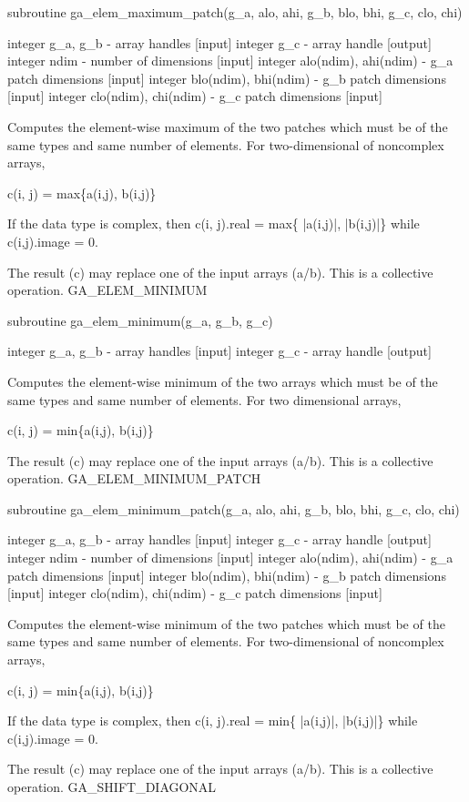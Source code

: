 subroutine ga\_elem\_maximum\_patch(g\_a, alo, ahi, g\_b, blo, bhi,
g\_c, clo, chi)

integer g\_a, g\_b - array handles {[}input{]} integer g\_c - array
handle {[}output{]} integer ndim - number of dimensions {[}input{]}
integer alo(ndim), ahi(ndim) - g\_a patch dimensions {[}input{]} integer
blo(ndim), bhi(ndim) - g\_b patch dimensions {[}input{]} integer clo(ndim),
chi(ndim) - g\_c patch dimensions {[}input{]}

Computes the element-wise maximum of the two patches which must be
of the same types and same number of elements. For two-dimensional
of noncomplex arrays,

c(i, j) = max\{a(i,j), b(i,j)\}

If the data type is complex, then c(i, j).real = max\{ |a(i,j)|, |b(i,j)|\}
while c(i,j).image = 0.

The result (c) may replace one of the input arrays (a/b). This is
a collective operation. GA\_ELEM\_MINIMUM

subroutine ga\_elem\_minimum(g\_a, g\_b, g\_c)

integer g\_a, g\_b - array handles {[}input{]} integer g\_c - array
handle {[}output{]}

Computes the element-wise minimum of the two arrays which must be
of the same types and same number of elements. For two dimensional
arrays,

c(i, j) = min\{a(i,j), b(i,j)\}

The result (c) may replace one of the input arrays (a/b). This is
a collective operation. GA\_ELEM\_MINIMUM\_PATCH

subroutine ga\_elem\_minimum\_patch(g\_a, alo, ahi, g\_b, blo, bhi,
g\_c, clo, chi)

integer g\_a, g\_b - array handles {[}input{]} integer g\_c - array
handle {[}output{]} integer ndim - number of dimensions {[}input{]}
integer alo(ndim), ahi(ndim) - g\_a patch dimensions {[}input{]} integer
blo(ndim), bhi(ndim) - g\_b patch dimensions {[}input{]} integer clo(ndim),
chi(ndim) - g\_c patch dimensions {[}input{]}

Computes the element-wise minimum of the two patches which must be
of the same types and same number of elements. For two-dimensional
of noncomplex arrays,

c(i, j) = min\{a(i,j), b(i,j)\}

If the data type is complex, then c(i, j).real = min\{ |a(i,j)|, |b(i,j)|\}
while c(i,j).image = 0.

The result (c) may replace one of the input arrays (a/b). This is
a collective operation. GA\_SHIFT\_DIAGONAL

